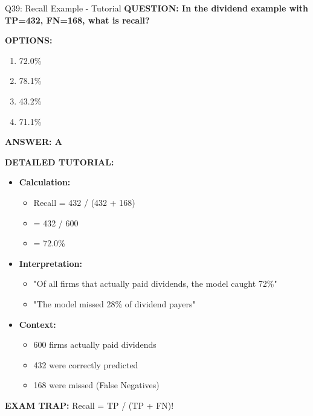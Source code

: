 \documentclass[8pt]{beamer}
\begin{document}
	\begin{frame}{Q39: Recall Example - Tutorial}
		\fontsize{6.5}{7.5}\selectfont
		\textbf{QUESTION: In the dividend example with TP=432, FN=168, what is recall?}
		
		\vspace{0.1cm}
		\textbf{OPTIONS:}
		\begin{enumerate}
			\item 72.0\%
			\item 78.1\%
			\item 43.2\%
			\item 71.1\%
		\end{enumerate}
		
		\vspace{0.1cm}
		\textcolor{myblue}{\textbf{ANSWER: A}}
		
		\vspace{0.1cm}
		\textbf{DETAILED TUTORIAL:}
		\begin{itemize}
			\item \textbf{Calculation:}
			\begin{itemize}
				\item Recall = 432 / (432 + 168)
				\item = 432 / 600
				\item = 72.0\%
			\end{itemize}
			\item \textbf{Interpretation:}
			\begin{itemize}
				\item "Of all firms that actually paid dividends, the model caught 72\%"
				\item "The model missed 28\% of dividend payers"
			\end{itemize}
			\item \textbf{Context:}
			\begin{itemize}
				\item 600 firms actually paid dividends
				\item 432 were correctly predicted
				\item 168 were missed (False Negatives)
			\end{itemize}
		\end{itemize}
		
		\textcolor{myred}{\textbf{EXAM TRAP:}} Recall = \textcolor{myblue}{TP / (TP + FN)}!
	\end{frame}
	
\end{document}
